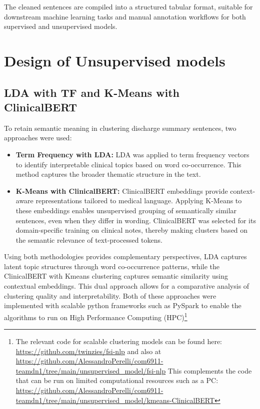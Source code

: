The cleaned sentences are compiled into a structured tabular format, suitable for downstream machine learning tasks and manual annotation workflows for both supervised and unsupervised models.

 
\section{Design of Unsupervised models}

\subsection{LDA with TF and K-Means with ClinicalBERT}

To retain semantic meaning in clustering discharge summary sentences, two approaches were used:

\begin{itemize}
    \item \textbf{Term Frequency with LDA:} LDA was applied to term frequency vectors to identify interpretable clinical topics based on word co-occurrence. This method captures the broader thematic structure in the text.
    
    \item \textbf{K-Means with ClinicalBERT:} ClinicalBERT embeddings provide context-aware representations tailored to medical language. Applying K-Means to these embeddings enables unsupervised grouping of semantically similar sentences, even when they differ in wording. ClinicalBERT was selected for its domain-specific training on clinical notes, thereby making clusters based on the semantic relevance of text-processed tokens.
\end{itemize}

Using both methodologies provides complementary perspectives, LDA captures latent topic structures through word co-occurrence patterns, while the ClinicalBERT with Kmeans clustering captures semantic similarity using contextual embeddings. This dual approach allows for a comparative analysis of clustering quality and interpretability. Both of these approaches were implemented with scalable python frameworks such as PySpark to enable the algorithms to run on High Performance Computing (HPC)\footnote{The relevant code for scalable clustering models can be found here: \url{https://github.com/twinzies/fsi-nlp} and also at \url{https://github.com/AlessandroPerelli/com6911-teamdn1/tree/main/unsupervised_model/fsi-nlp} This complements the code that can be run on limited computational resources such as a PC: \url{https://github.com/AlessandroPerelli/com6911-teamdn1/tree/main/unsupervised_model/kmeans-ClinicalBERT}} \medskip


